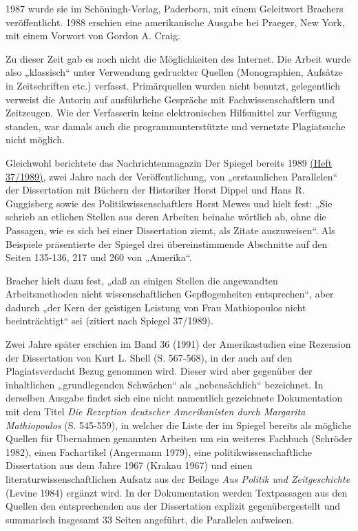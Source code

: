 \documentclass[ngerman,final,fontsize=12pt,paper=a4,twoside,bibliography=totoc,BCOR=8mm,draft=false]{scrartcl}
\begin{document}

1987 wurde sie im Schöningh-Verlag, Paderborn, mit einem Geleitwort Brachers veröffentlicht. 1988 erschien eine amerikanische Ausgabe bei Praeger, New York, mit einem Vorwort von Gordon A. Craig. 


Zu dieser Zeit gab es noch nicht die Möglichkeiten des Internet. Die Arbeit wurde also „klassisch“ unter Verwendung gedruckter Quellen (Monographien, Aufsätze in Zeitschriften etc.) verfasst. Primärquellen wurden nicht benutzt, gelegentlich verweist die Autorin auf ausführliche Gespräche mit Fachwissenschaftlern und Zeitzeugen. Wie der Verfasserin keine elektronischen Hilfsmittel zur Verfügung standen, war damals auch die programmunterstützte und vernetzte Plagiatsuche nicht möglich. 


Gleichwohl berichtete das Nachrichtenmagazin Der Spiegel bereits 1989 %
\href{http://www.spiegel.de/spiegel/print/d-13496867.html}{(Heft 37/1989)}, zwei Jahre nach der Veröffentlichung, von „erstaunlichen Parallelen“ der Dissertation mit Büchern der Historiker Horst Dippel und Hans R. Guggisberg sowie des Politikwissenschaftlers Horst Mewes und hielt fest: „Sie schrieb an etlichen Stellen aus deren Arbeiten beinahe wörtlich ab, ohne die Passagen, wie es sich bei einer Dissertation ziemt, als Zitate auszuweisen“. Als Beispiele präsentierte der Spiegel drei übereinstimmende Abschnitte auf den Seiten 135-136, 217 und 260 von „Amerika“. 


Bracher hielt dazu fest, „daß an einigen Stellen die angewandten Arbeitsmethoden nicht wissenschaftlichen Gepflogenheiten entsprechen“, aber dadurch „der Kern der geistigen Leistung von Frau Mathiopoulos nicht beeinträchtigt“ sei (zitiert nach Spiegel 37/1989). 


Zwei Jahre später erschien im Band 36 (1991) der Amerikastudien eine Rezension der Dissertation von Kurt L. Shell (S. 567-568), in der auch auf den Plagiatsverdacht Bezug genommen wird. Dieser wird aber gegenüber der inhaltlichen „grundlegenden Schwächen“ als „nebensächlich“ bezeichnet. In derselben Ausgabe findet sich eine nicht namentlich gezeichnete Dokumentation mit dem Titel %
\textit{Die Rezeption deutscher Amerikanisten durch Margarita Mathiopoulos} (S. 545-559), in welcher die Liste der im Spiegel bereits als mögliche Quellen für Übernahmen genannten Arbeiten um ein weiteres Fachbuch (Schröder 1982), einen Fachartikel (Angermann 1979), eine politikwissenschaftliche Dissertation aus dem Jahre 1967 (Krakau 1967) und einen literaturwissenschaftlichen Aufsatz aus der Beilage %
\textit{Aus Politik und Zeitgeschichte} (Levine 1984) ergänzt wird. In der Dokumentation werden Textpassagen aus den Quellen den entsprechenden aus der Dissertation explizit gegenübergestellt und summarisch insgesamt 33 Seiten angeführt, die Parallelen aufweisen. 
\end{document}
